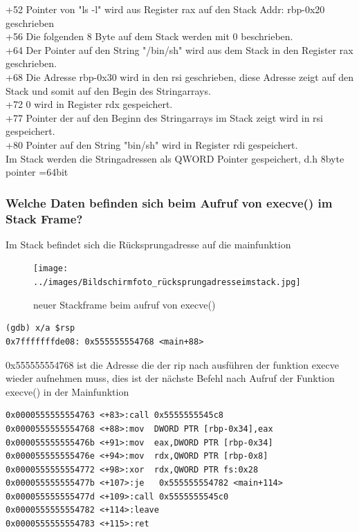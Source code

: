 \documentclass[12pt]{article}
\begin{document}
+52 Pointer von "ls -l" wird aus Register rax auf den Stack Addr: rbp-0x20 geschrieben\\
+56 Die folgenden 8 Byte auf dem Stack werden mit 0 beschrieben.\\
+64 Der Pointer auf den String "/bin/sh" wird aus dem Stack in den Register rax geschrieben.\\
+68 Die Adresse rbp-0x30 wird in den rsi geschrieben, diese Adresse zeigt auf den Stack und somit auf den Begin des Stringarrays.\\
+72	0 wird in Register rdx gespeichert.\\
+77 Pointer der auf den Beginn des Stringarrays im Stack zeigt wird in rsi gespeichert.\\ 
+80 Pointer auf den String "bin/sh" wird in Register rdi gespeichert.\\

Im Stack werden die Stringadressen als QWORD Pointer gespeichert, d.h 8byte pointer =64bit



\newpage
\subsubsection{Welche Daten befinden sich beim Aufruf von execve() im Stack Frame?}
Im Stack befindet sich die Rücksprungadresse auf die mainfunktion

\begin{figure}[h!]
	\texttt{[image: ../images/Bildschirmfoto\_rücksprungadresseimstack.jpg]}
	\caption{neuer Stackframe beim aufruf von execve()}
\end{figure}

\begin{lstlisting}
(gdb) x/a $rsp
0x7fffffffde08:	0x555555554768 <main+88>
\end{lstlisting}
0x555555554768
ist die Adresse die der rip nach ausführen der funktion execve wieder aufnehmen muss,
dies ist der nächste Befehl nach Aufruf der Funktion execve() in der Mainfunktion
\begin{lstlisting}
0x0000555555554763 <+83>:call 0x5555555545c8
0x0000555555554768 <+88>:mov  DWORD PTR [rbp-0x34],eax
0x000055555555476b <+91>:mov  eax,DWORD PTR [rbp-0x34]
0x000055555555476e <+94>:mov  rdx,QWORD PTR [rbp-0x8]
0x0000555555554772 <+98>:xor  rdx,QWORD PTR fs:0x28
0x000055555555477b <+107>:je   0x555555554782 <main+114>
0x000055555555477d <+109>:call 0x5555555545c0
0x0000555555554782 <+114>:leave  
0x0000555555554783 <+115>:ret    
\end{lstlisting}
\end{document}
